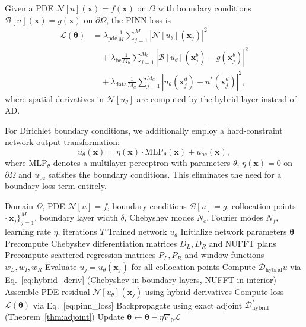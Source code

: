 \documentclass[sn-mathphys,Numbered]{sn-jnl}
\theoremstyle{thmstyleone}
\theoremstyle{thmstyletwo}
\theoremstyle{thmstylethree}
\newcommand{\calD}{\mathcal{D}}
\newcommand{\calL}{\mathcal{L}}
\newcommand{\calN}{\mathcal{N}}
\newcommand{\calB}{\mathcal{B}}
\newcommand{\bftheta}{\boldsymbol{\theta}}
\newcommand{\bfx}{\boldsymbol{x}}
\newcommand{\hybrid}{\mathrm{hybrid}}
\begin{document}
Given a PDE $\calN[u](\bfx) = f(\bfx)$ on $\Omega$ with boundary conditions $\calB[u](\bfx) = g(\bfx)$ on $\partial\Omega$, the PINN loss is
\begin{align}
    \calL(\bftheta) &= \lambda_{\mathrm{pde}} \frac{1}{M} \sum_{j=1}^{M} |\calN[u_\theta](\bfx_j)|^2 \nonumber \\
    &\quad + \lambda_{\mathrm{bc}} \frac{1}{M_b} \sum_{j=1}^{M_b} |\calB[u_\theta](\bfx_j^b) - g(\bfx_j^b)|^2 \\
    &\quad + \lambda_{\mathrm{data}} \frac{1}{M_d} \sum_{j=1}^{M_d} |u_\theta(\bfx_j^d) - u^*(\bfx_j^d)|^2,
    \label{eq:pinn_loss}
\end{align}
where spatial derivatives in $\calN[u_\theta]$ are computed by the hybrid layer instead of AD.

For Dirichlet boundary conditions, we additionally employ a hard-constraint network output transformation:
\begin{equation}
    u_\theta(\bfx) = \eta(\bfx) \cdot \mathrm{MLP}_\theta(\bfx) + u_{\mathrm{bc}}(\bfx),
    \label{eq:hard_bc}
\end{equation}
where $\mathrm{MLP}_\theta$ denotes a multilayer perceptron with parameters $\theta$, $\eta(\bfx) = 0$ on $\partial\Omega$ and $u_{\mathrm{bc}}$ satisfies the boundary conditions. This eliminates the need for a boundary loss term entirely.

\begin{algorithm}[t]
\caption{Training PINN with differentiable Chebyshev--NUFFT hybrid layer}
\label{alg:training}
\begin{algorithmic}[1]
\Require Domain $\Omega$, PDE $\calN[u]=f$, boundary conditions $\calB[u]=g$,
         collocation points $\{\bfx_j\}_{j=1}^M$, boundary layer width $\delta$,
         Chebyshev modes $N_c$, Fourier modes $N_f$, learning rate $\eta$, iterations $T$
\Ensure Trained network $u_\theta$
\State Initialize network parameters $\bftheta$
\State Precompute Chebyshev differentiation matrices $D_L, D_R$ and NUFFT plans
\State Precompute scattered regression matrices $P_L, P_R$ and window functions $w_L, w_I, w_R$
    \State Evaluate $u_j = u_\theta(\bfx_j)$ for all collocation points
    \State Compute $\calD_{\hybrid} u$ via Eq.~\eqref{eq:hybrid_deriv} (Chebyshev in boundary layers, NUFFT in interior)
    \State Assemble PDE residual $\calN[u_\theta](\bfx_j)$ using hybrid derivatives
    \State Compute loss $\calL(\bftheta)$ via Eq.~\eqref{eq:pinn_loss}
    \State Backpropagate using exact adjoint $\calD_{\hybrid}^*$ (Theorem~\ref{thm:adjoint})
    \State Update $\bftheta \leftarrow \bftheta - \eta \nabla_{\bftheta} \calL$
\EndFor
\end{algorithmic}
\end{algorithm}
\end{document}
